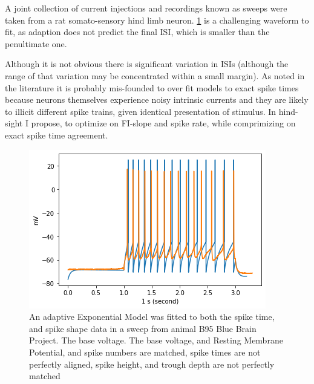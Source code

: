 
A joint collection of current injections and recordings known as sweeps were taken from a rat somato-sensory hind limb neuron.
\ref{fig:B95Adexp} is a challenging waveform to fit, as adaption does not predict the final ISI, which is smaller than the penultimate one. 

Although it is not obvious there is significant variation in ISIs (although the range of that variation may be concentrated within a small margin). As noted in the literature \cite{druckmann2007novel} it is probably mis-founded to over fit models to exact spike times because neurons themselves experience noisy intrinsic currents and they are likely to illicit different spike trains, given identical presentation of stimulus. In hind-sight I propose, to optimize on FI-slope and spike rate, while comprimizing on exact spike time agreement.

\begin{figure}
    \centering
    \includegraphics[scale=0.75]{figures/bbp_multispiking_fit.png}
    \caption{An adaptive Exponential Model was fitted to both the spike time, and spike shape data in a sweep from animal B95 
    Blue Brain Project. The base voltage. The base voltage, and Resting Membrane Potential, and spike numbers are matched, spike times are not perfectly aligned, spike height, and trough depth are not perfectly matched}
    \label{fig:B95Adexp}
\end{figure}

